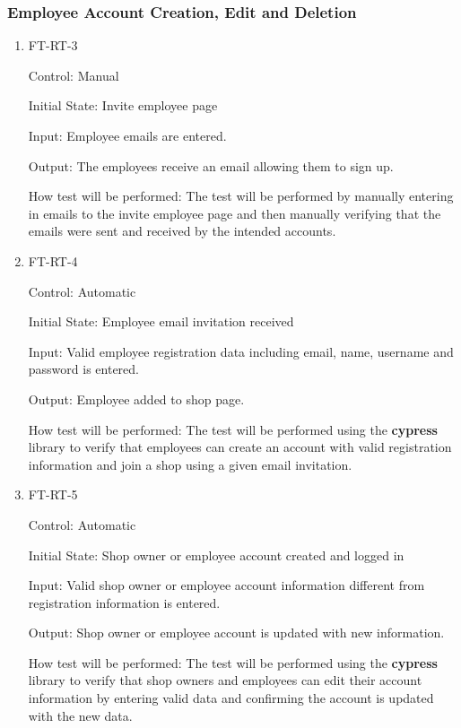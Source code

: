 \documentclass[12pt, titlepage]{article}
\begin{document}
\subsubsection{Employee Account Creation, Edit and Deletion}

\begin{enumerate}

\item{FT-RT-3\\}

Control: Manual
					
Initial State: Invite employee page
					
Input: Employee emails are entered.
					
Output: The employees receive an email allowing them to sign up.

How test will be performed: The test will be performed by manually entering in emails to the invite employee page and then manually verifying that the emails were sent and received by the intended accounts.

\item{FT-RT-4\\}

Control: Automatic
					
Initial State: Employee email invitation received
					
Input: Valid employee registration data including email, name, username and password is entered.
					
Output: Employee added to shop page.

How test will be performed: The test will be performed using the \textbf{cypress} library to verify that employees can create an account with valid registration information and join a shop using a given email invitation.

\item{FT-RT-5\\}

Control: Automatic
					
Initial State: Shop owner or employee account created and logged in
					
Input: Valid shop owner or employee account information different from registration information is entered.
					
Output: Shop owner or employee account is updated with new information.

How test will be performed: The test will be performed using the \textbf{cypress} library to verify that shop owners and employees can edit their account information by entering valid data and confirming the account is updated with the new data.


\end{enumerate}
\end{document}

